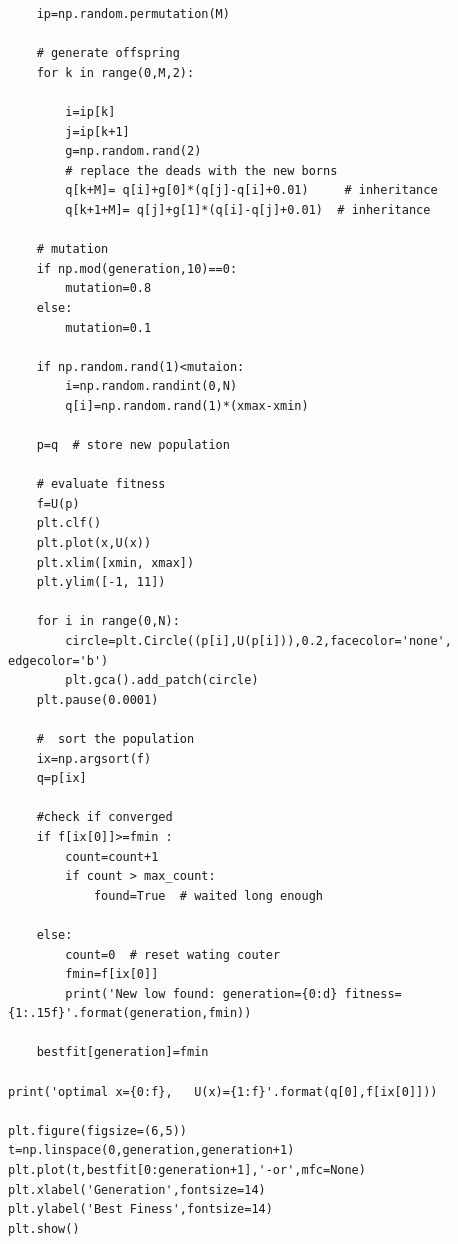\begin{verbatim}
    ip=np.random.permutation(M)  
    
    # generate offspring
    for k in range(0,M,2):

        i=ip[k]
        j=ip[k+1]
        g=np.random.rand(2)
        # replace the deads with the new borns
        q[k+M]= q[i]+g[0]*(q[j]-q[i]+0.01)     # inheritance
        q[k+1+M]= q[j]+g[1]*(q[i]-q[j]+0.01)  # inheritance
    
    # mutation
    if np.mod(generation,10)==0:
        mutation=0.8
    else:
        mutation=0.1
    
    if np.random.rand(1)<mutaion:
        i=np.random.randint(0,N)
        q[i]=np.random.rand(1)*(xmax-xmin)

    p=q  # store new population
    
    # evaluate fitness
    f=U(p)
    plt.clf()
    plt.plot(x,U(x))
    plt.xlim([xmin, xmax])
    plt.ylim([-1, 11])

    for i in range(0,N):
        circle=plt.Circle((p[i],U(p[i])),0.2,facecolor='none', edgecolor='b')
        plt.gca().add_patch(circle)
    plt.pause(0.0001)

    #  sort the population
    ix=np.argsort(f)
    q=p[ix]
    
    #check if converged
    if f[ix[0]]>=fmin :
        count=count+1
        if count > max_count:
            found=True  # waited long enough

    else:
        count=0  # reset wating couter
        fmin=f[ix[0]]
        print('New low found: generation={0:d} fitness={1:.15f}'.format(generation,fmin))

    bestfit[generation]=fmin

print('optimal x={0:f},   U(x)={1:f}'.format(q[0],f[ix[0]]))

plt.figure(figsize=(6,5))
t=np.linspace(0,generation,generation+1)
plt.plot(t,bestfit[0:generation+1],'-or',mfc=None)
plt.xlabel('Generation',fontsize=14)
plt.ylabel('Best Finess',fontsize=14)
plt.show()
\end{verbatim}
\normalsize


